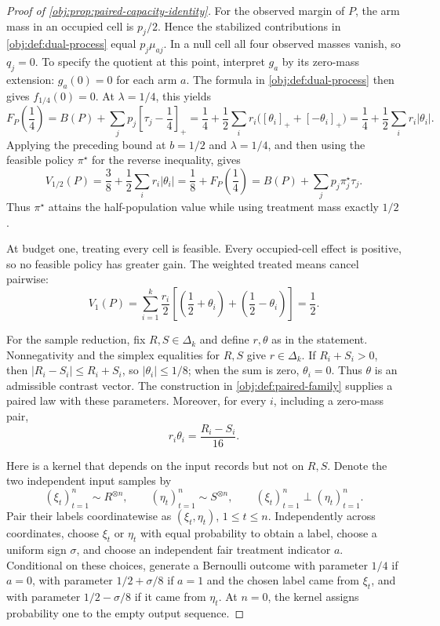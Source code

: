 \documentclass[11pt]{article}
\begin{document}
\begin{proof}[Proof of \cref{obj:prop:paired-capacity-identity}]
For the observed margin of \(P\), the arm mass in an occupied cell is \(p_j/2\). Hence the stabilized contributions in \cref{obj:def:dual-process} equal \(p_j\mu_{aj}\). In a null cell all four observed masses vanish, so \(q_j=0\). To specify the quotient at this point, interpret \(g_a\) by its zero-mass extension: \(g_a(0)=0\) for each arm \(a\). The formula in \cref{obj:def:dual-process} then gives \(f_{1/4}(0)=0\). At \(\lambda=1/4\), this yields
\[
F_P\!\left(\frac14\right)
=B(P)+\sum_jp_j\left[\tau_j-\frac14\right]_+
=\frac14+\frac12\sum_i r_i
 \bigl([\theta_i]_++[-\theta_i]_+\bigr)
=\frac14+\frac12\sum_i r_i|\theta_i|.
\] %
Applying the preceding bound at \(b=1/2\) and \(\lambda=1/4\), and then using the feasible policy \(\pi^\star\) for the reverse inequality, gives
\[
V_{1/2}(P)
=\frac38+\frac12\sum_i r_i|\theta_i|
=\frac18+F_P\!\left(\frac14\right)
=B(P)+\sum_jp_j\pi^\star_j\tau_j.
\] %
Thus \(\pi^\star\) attains the half-population value while using treatment mass exactly \(1/2\).

At budget one, treating every cell is feasible. Every occupied-cell effect is positive, so no feasible policy has greater gain. The weighted treated means cancel pairwise:
\[
V_1(P)
=\sum_{i=1}^k\frac{r_i}{2}
 \left[\left(\frac12+\theta_i\right)
       +\left(\frac12-\theta_i\right)\right]
=\frac12.
\] %

For the sample reduction, fix \(R,S\in\Delta_k\) and define \(r,\theta\) as in the statement. Nonnegativity and the simplex equalities for \(R,S\) give \(r\in\Delta_k\). If \(R_i+S_i>0\), then \(|R_i-S_i|\leq R_i+S_i\), so \(|\theta_i|\leq1/8\); when the sum is zero, \(\theta_i=0\). Thus \(\theta\) is an admissible contrast vector. The construction in \cref{obj:def:paired-family} supplies a paired law with these parameters. Moreover, for every \(i\), including a zero-mass pair,
\[
r_i\theta_i=\frac{R_i-S_i}{16}.
\] %

Here is a kernel that depends on the input records but not on \(R,S\). Denote the two independent input samples by
\[
(\xi_t)_{t=1}^n\sim R^{\otimes n},\qquad
(\eta_t)_{t=1}^n\sim S^{\otimes n},\qquad
(\xi_t)_{t=1}^n\perp(\eta_t)_{t=1}^n.
\]
Pair their labels coordinatewise as \((\xi_t,\eta_t)\), \(1\leq t\leq n\). Independently across coordinates, choose \(\xi_t\) or \(\eta_t\) with equal probability to obtain a label, choose a uniform sign \(\sigma\), and choose an independent fair treatment indicator \(a\). Conditional on these choices, generate a Bernoulli outcome with parameter \(1/4\) if \(a=0\), with parameter \(1/2+\sigma/8\) if \(a=1\) and the chosen label came from \(\xi_t\), and with parameter \(1/2-\sigma/8\) if it came from \(\eta_t\). At \(n=0\), the kernel assigns probability one to the empty output sequence.


\end{proof}
\end{document}
